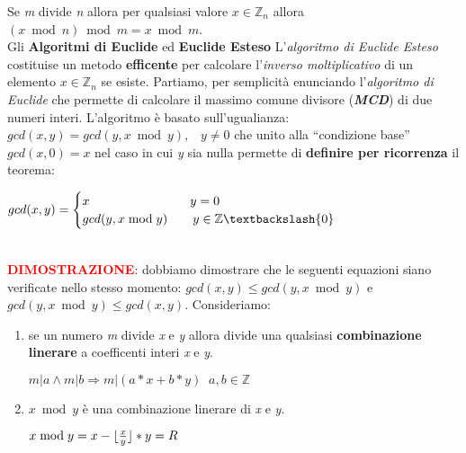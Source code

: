 \newline
Se \textit{m} divide \textit{n} allora per qualsiasi valore $x \in \mathbb{Z}_n$ allora $(x \bmod n) \bmod m = x \bmod m$.
\\ \newline
Gli \textbf{Algoritmi di Euclide} ed \textbf{Euclide Esteso}
\newline
L'\textit{algoritmo di Euclide Esteso} costituise un metodo \textbf{efficente} per calcolare l'\textit{inverso moltiplicativo} di un elemento $x \in \mathbb{Z}_n$ se esiste.
\newline
Partiamo, per semplicità enunciando l'\textit{algoritmo di Euclide} che permette di calcolare il massimo comune divisore (\textbf{\textit{MCD}}) di due numeri interi. L'algoritmo è basato sull'ugualianza: $gcd(x, y) = gcd(y, x \bmod y),\;\;\;y\neq0$ che unito alla ``condizione base'' $gcd(x, 0) = x$ nel caso in cui \textit{y} sia nulla permette di \textbf{definire per ricorrenza} il teorema:
\begin{center}
    \begin{math}
        gcd(x, y) = 
        \begin{cases}
            x \qquad \qquad \qquad \qquad y = 0 \\
            gcd(y, x \bmod y) \qquad y \in \mathbb{Z} \textbackslash \{0\}
        \end{cases}
    \end{math}
\end{center}
\   \\ \newline
\textcolor{red}{\textbf{DIMOSTRAZIONE}}: dobbiamo dimostrare che le seguenti equazioni siano verificate nello stesso momento: $gcd(x, y) \leq gcd(y, x \bmod y)$ e $gcd(y, x \bmod y) \leq gcd(x, y)$. Consideriamo:
\begin{enumerate}
    \item se un numero \textit{m} divide \textit{x} e \textit{y} allora divide una qualsiasi \textbf{combinazione linerare} a coefficenti interi \textit{x} e \textit{y}.
    \begin{center}
        $ m|a \land m|b \Rightarrow m|(a*x + b*y)\;\;a,b\in\mathbb{Z}$
    \end{center}
    \item $x \bmod y$ è una combinazione linerare di \textit{x} e \textit{y}.
    \begin{center}
        $x \bmod y = x - \lfloor\frac{x}{y}\rfloor * y = R$
    \end{center}
\end{enumerate}

